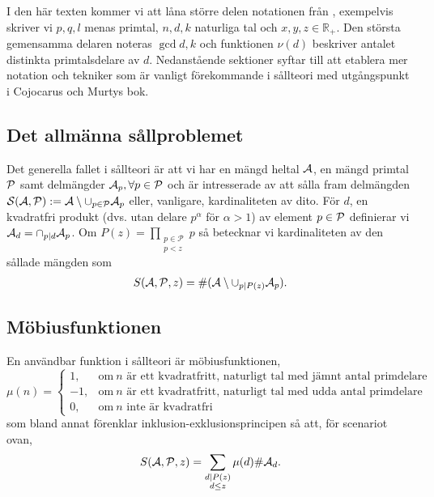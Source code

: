 
I den här texten kommer vi att låna större delen notationen från \cite{cojocarumurty}, exempelvis skriver vi \(p, q, l\) menas primtal, \(n, d, k\) naturliga tal och \(x, y, z \in \mathbb{R}_+\). Den största gemensamma delaren noteras \(\gcd{d, k}\) och funktionen \(\nu(d)\) beskriver antalet distinkta primtalsdelare av \(d\). Nedanstående sektioner syftar till att etablera mer notation och tekniker som är vanligt förekommande i sållteori med utgångspunkt i Cojocarus och Murtys bok.


\subsection{Det allmänna sållproblemet}
Det generella fallet i sållteori är att vi har en mängd heltal \(\A\), en mängd primtal \(\P\) samt delmängder \(\A_p, \forall p \in \P\) och är intresserade av att sålla fram delmängden \(\mathcal{S}(\A, \P) := \A \setminus \cup_{p \in \P} \A_p\) eller, vanligare, kardinaliteten av dito. För \(d\), en kvadratfri produkt (dvs. utan delare \(p^\alpha\) för \(\alpha > 1\)) av element \(p \in \P\) definierar vi \(\A_d = \cap_{p \divides d} \A_p\). Om \(P(z) = \prod_{\substack{p\in \mathcal{P} \\ p < z}} p\) så betecknar vi kardinaliteten av den sållade mängden som
\begin{align*}
    \S{A}{P}{z} = \card{(\A \setminus \cup_{p \divides P(z)} \A_p)} .
\end{align*}




\subsection{Möbiusfunktionen}
En användbar funktion i sållteori är möbiusfunktionen,
\begin{equation*}
    \mu(n) = 
    \begin{cases}
        1, & \text{om}\ n \text{ är ett kvadratfritt, naturligt tal med jämnt antal primdelare}\\
        -1, & \text{om}\ n \text{ är ett kvadratfritt, naturligt tal med udda antal primdelare}\\
        0, & \text{om}\ n \text{ inte är kvadratfri}
    \end{cases}
\end{equation*}
som bland annat förenklar inklusion-exklusionsprincipen så att, för scenariot ovan,
\begin{align*}
    \S{A}{P}{z} = \sum_{\substack{d \divides P(z) \\ d \leq z}} \mu(d) \card{\A_d} .
\end{align*} %

